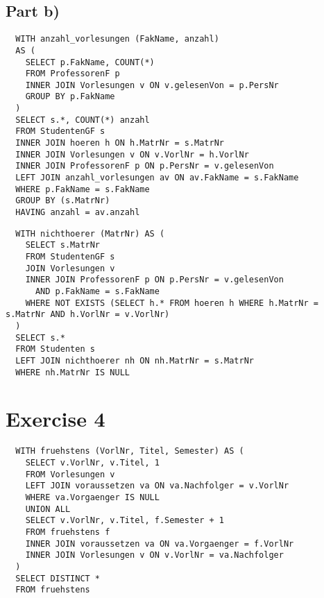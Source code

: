 \documentclass[10pt,a4paper]{article}
\begin{document}
\subsection*{Part b)}

\begin{verbatim}
  WITH anzahl_vorlesungen (FakName, anzahl)
  AS (
    SELECT p.FakName, COUNT(*)
    FROM ProfessorenF p
    INNER JOIN Vorlesungen v ON v.gelesenVon = p.PersNr
    GROUP BY p.FakName
  )
  SELECT s.*, COUNT(*) anzahl
  FROM StudentenGF s
  INNER JOIN hoeren h ON h.MatrNr = s.MatrNr
  INNER JOIN Vorlesungen v ON v.VorlNr = h.VorlNr
  INNER JOIN ProfessorenF p ON p.PersNr = v.gelesenVon
  LEFT JOIN anzahl_vorlesungen av ON av.FakName = s.FakName
  WHERE p.FakName = s.FakName
  GROUP BY (s.MatrNr)
  HAVING anzahl = av.anzahl
\end{verbatim}

\begin{verbatim}
  WITH nichthoerer (MatrNr) AS (
    SELECT s.MatrNr
    FROM StudentenGF s
    JOIN Vorlesungen v
    INNER JOIN ProfessorenF p ON p.PersNr = v.gelesenVon
      AND p.FakName = s.FakName
    WHERE NOT EXISTS (SELECT h.* FROM hoeren h WHERE h.MatrNr = s.MatrNr AND h.VorlNr = v.VorlNr)
  )
  SELECT s.*
  FROM Studenten s
  LEFT JOIN nichthoerer nh ON nh.MatrNr = s.MatrNr
  WHERE nh.MatrNr IS NULL
\end{verbatim}

\section*{Exercise 4}

\begin{verbatim}
  WITH fruehstens (VorlNr, Titel, Semester) AS (
    SELECT v.VorlNr, v.Titel, 1
    FROM Vorlesungen v
    LEFT JOIN voraussetzen va ON va.Nachfolger = v.VorlNr
    WHERE va.Vorgaenger IS NULL
    UNION ALL
    SELECT v.VorlNr, v.Titel, f.Semester + 1
    FROM fruehstens f
    INNER JOIN voraussetzen va ON va.Vorgaenger = f.VorlNr
    INNER JOIN Vorlesungen v ON v.VorlNr = va.Nachfolger
  )
  SELECT DISTINCT *
  FROM fruehstens
\end{verbatim}
\end{document}
